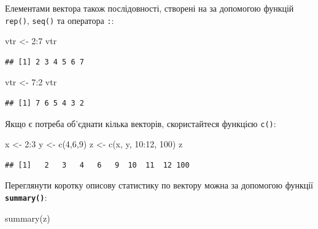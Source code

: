 \documentclass[
]{book}
\newenvironment{Shaded}{\begin{snugshade}}{\end{snugshade}}
\newcommand{\DecValTok}[1]{\textcolor[rgb]{0.00,0.00,0.81}{#1}}
\newcommand{\FunctionTok}[1]{\textcolor[rgb]{0.00,0.00,0.00}{#1}}
\newcommand{\NormalTok}[1]{#1}
\newcommand{\OtherTok}[1]{\textcolor[rgb]{0.56,0.35,0.01}{#1}}
\newcommand{\SpecialCharTok}[1]{\textcolor[rgb]{0.00,0.00,0.00}{#1}}
\begin{document}
Елементами вектора також послідовності, створені на за допомогою функцій \texttt{rep()}, \texttt{seq()} та оператора \texttt{:}:

\begin{Shaded}
\begin{Highlighting}[]
\NormalTok{vtr }\OtherTok{\textless{}{-}}  \DecValTok{2}\SpecialCharTok{:}\DecValTok{7}
\NormalTok{vtr}
\end{Highlighting}
\end{Shaded}

\begin{verbatim}
## [1] 2 3 4 5 6 7
\end{verbatim}

\begin{Shaded}
\begin{Highlighting}[]
\NormalTok{vtr }\OtherTok{\textless{}{-}} \DecValTok{7}\SpecialCharTok{:}\DecValTok{2}
\NormalTok{vtr}
\end{Highlighting}
\end{Shaded}

\begin{verbatim}
## [1] 7 6 5 4 3 2
\end{verbatim}

Якщо є потреба об'єднати кілька векторів, скористайтеся функцією \texttt{c()}:

\begin{Shaded}
\begin{Highlighting}[]
\NormalTok{x }\OtherTok{\textless{}{-}} \DecValTok{2}\SpecialCharTok{:}\DecValTok{3}
\NormalTok{y }\OtherTok{\textless{}{-}} \FunctionTok{c}\NormalTok{(}\DecValTok{4}\NormalTok{,}\DecValTok{6}\NormalTok{,}\DecValTok{9}\NormalTok{)}
\NormalTok{z }\OtherTok{\textless{}{-}} \FunctionTok{c}\NormalTok{(x, y, }\DecValTok{10}\SpecialCharTok{:}\DecValTok{12}\NormalTok{, }\DecValTok{100}\NormalTok{)}
\NormalTok{z}
\end{Highlighting}
\end{Shaded}

\begin{verbatim}
## [1]   2   3   4   6   9  10  11  12 100
\end{verbatim}

Переглянути коротку описову статистику по вектору можна за допомогою функції \textbf{\texttt{summary()}}:

\begin{Shaded}
\begin{Highlighting}[]
\FunctionTok{summary}\NormalTok{(z)}
\end{Highlighting}
\end{Shaded}
\end{document}
